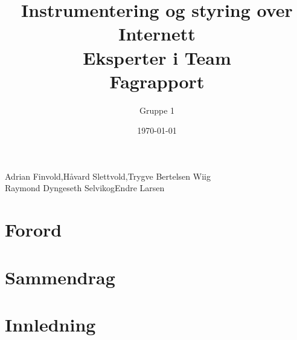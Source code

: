 \documentclass[a4paper, 11pt]{article}
\title{Instrumentering og styring over Internett\\Eksperter i Team\\Fagrapport}
\author{Gruppe 1}
\date{\today}
\newcommand{\HS}{Håvard Slettvold}
\newcommand{\AF}{Adrian Finvold}
\newcommand{\TW}{Trygve Bertelsen Wiig}
\newcommand{\RS}{Raymond Dyngeseth Selvik}
\newcommand{\EL}{Endre Larsen}
\begin{document}
 

\thispagestyle{fancy} %

\maketitle 

\vspace*{\fill}
\begin{center}
\AF,\hspace{0.1cm}\HS,\hspace{0.1cm}\TW \\
\RS\hspace{0.1cm}og\hspace{0.1cm}\EL
\end{center}

\clearpage

 \newpage
\section*{Forord}

 \newpage
\section*{Sammendrag}


 \newpage

 \tableofcontents
\newpage


 \newpage
\section{Innledning}
\end{document}
